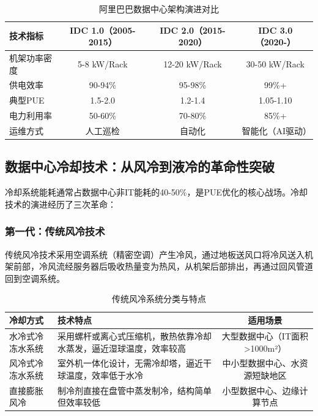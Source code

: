 \begin{table}[htbp]
\centering
\caption{阿里巴巴数据中心架构演进对比}
\begin{tabular}{lccc}
\toprule
\textbf{技术指标} & \textbf{IDC 1.0（2005-2015）} & \textbf{IDC 2.0（2015-2020）} & \textbf{IDC 3.0（2020-）} \\
\midrule
机架功率密度 & 5-8 kW/Rack & 12-20 kW/Rack & 30-50 kW/Rack \\
供电效率 & 90-94\% & 95-98\% & 99\%+ \\
典型PUE & 1.5-2.0 & 1.2-1.4 & 1.05-1.10 \\
电力利用率 & 50-60\% & 70-80\% & 85\%+ \\
运维方式 & 人工巡检 & 自动化 & 智能化（AI驱动） \\
\bottomrule
\end{tabular}
\label{tab:alibaba-idc-evolution}
\end{table}

\subsection{数据中心冷却技术：从风冷到液冷的革命性突破}

冷却系统能耗通常占数据中心非IT能耗的40-50\%，是PUE优化的核心战场。冷却技术的演进经历了三次革命：

\subsubsection{第一代：传统风冷技术}

传统风冷技术采用空调系统（精密空调）产生冷风，通过地板送风口将冷风送入机架前部，冷风流经服务器后吸收热量变为热风，从机架后部排出，再通过回风管道回到空调系统。

\begin{table}[htbp]
\centering
\caption{传统风冷系统分类与特点}
\begin{tabular}{lp{6cm}c}
\toprule
\textbf{冷却方式} & \textbf{技术特点} & \textbf{适用场景} \\
\midrule
水冷式冷冻水系统 & 采用螺杆或离心式压缩机，散热依靠冷却水蒸发，逼近湿球温度，效率较高 & 大型数据中心（IT面积>1000m²） \\
风冷式冷冻水系统 & 室外机一体化设计，无需冷却塔，逼近干球温度，效率低于水冷 & 中小型数据中心、水资源短缺地区 \\
直接膨胀风冷 & 制冷剂直接在盘管中蒸发制冷，结构简单但效率较低 & 小型数据中心、边缘计算节点 \\
\bottomrule
\end{tabular}
\label{tab:air-cooling-types}
\end{table}

